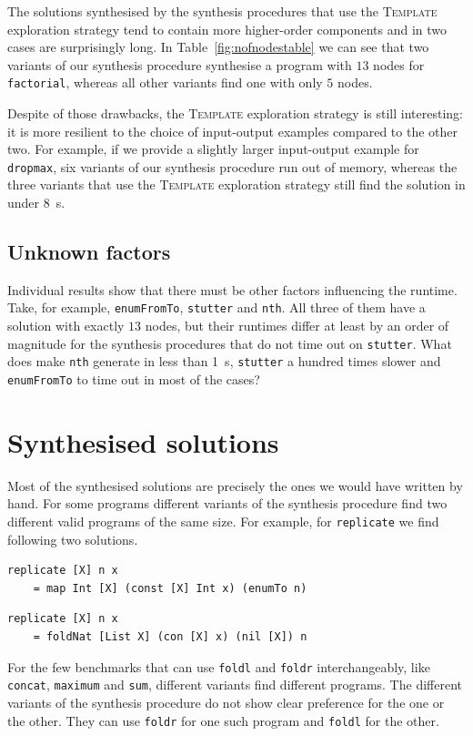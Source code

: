 The solutions synthesised by the synthesis procedures that use the \textsc{Template} exploration strategy tend to contain more higher-order components and in two cases are surprisingly long. In Table~\ref{fig:nofnodestable} we can see that two variants of our synthesis procedure synthesise a program with $13$ nodes for \lstinline?factorial?, whereas all other variants find one with only $5$ nodes.

Despite of those drawbacks, the \textsc{Template} exploration strategy is still interesting: it is more resilient to the choice of input-output examples compared to the other two. For example, if we provide a slightly larger input-output example for \lstinline?dropmax?, six variants of our synthesis procedure run out of memory, whereas the three variants that use the \textsc{Template} exploration strategy still find the solution in under \SI{8}{s}.

\subsection{Unknown factors}
Individual results show that there must be other factors influencing the runtime. Take, for example, \lstinline?enumFromTo?, \lstinline?stutter? and \lstinline?nth?. All three of them have a solution with exactly $13$ nodes, but their runtimes differ at least by an order of magnitude for the synthesis procedures that do not time out on \lstinline?stutter?. What does make \lstinline?nth? generate in less than \SI{1}{s}, \lstinline?stutter? a hundred times slower and \lstinline?enumFromTo? to time out in most of the cases?

\section{Synthesised solutions}
Most of the synthesised solutions are precisely the ones we would have written by hand. For some programs different variants of the synthesis procedure find two different valid programs of the same size. For example, for \lstinline?replicate? we find following two solutions.
\begin{lstlisting}
replicate [X] n x
    = map Int [X] (const [X] Int x) (enumTo n)
\end{lstlisting}
\begin{lstlisting}
replicate [X] n x
    = foldNat [List X] (con [X] x) (nil [X]) n
\end{lstlisting}

For the few benchmarks that can use \lstinline?foldl? and \lstinline?foldr? interchangeably, like \lstinline?concat?, \lstinline?maximum? and \lstinline?sum?, different variants find different programs. The different variants of the synthesis procedure do not show clear preference for the one or the other. They can use \lstinline?foldr? for one such program and \lstinline?foldl? for the other.

